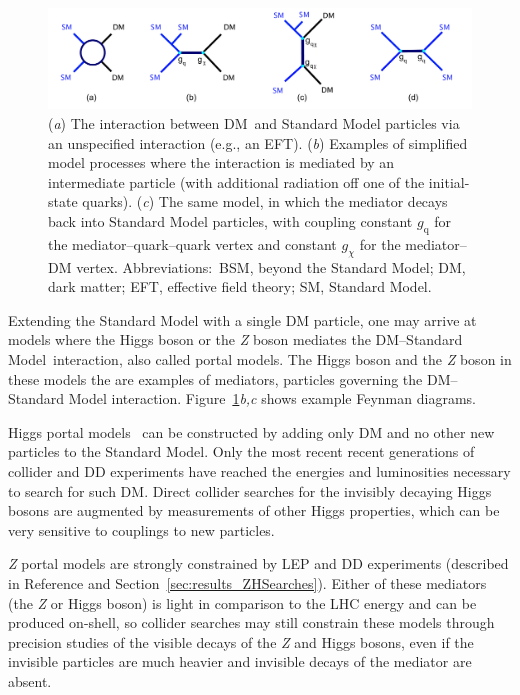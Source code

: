 \documentclass{ar-1col}
\newcommand{\chiDM}{\ensuremath{\chi}\xspace}
\newcommand{\IP}{invisible particle}
\newcommand{\gDM}{\ensuremath{g_{\chiDM}}\xspace}
\newcommand{\gdm}{\gDM}
\newcommand{\gq}{$g_{\mathrm{q}}$\xspace}
\begin{document}
{\begin{figure}[!htpb]
\includegraphics[width=\textwidth]{figures/feynman_0}
\caption{(\textit{a}) The interaction between DM\ and Standard Model particles via an unspecified interaction (e.g., an EFT).
(\textit{b}) Examples of simplified model processes where the interaction is mediated by an intermediate particle (with additional radiation off one of the initial-state quarks). 
(\textit{c}) The same model, in which  the mediator decays back into Standard Model particles, with coupling constant  \gq  for the mediator--quark--quark vertex and constant  \gdm for the mediator--DM vertex. 
Abbreviations:\ BSM, beyond the Standard Model; DM, dark matter; EFT, effective field theory; SM, Standard Model. \label{fig:feynman_0}}
\end{figure}

Extending the Standard Model with a single DM particle, one
may arrive at models where the Higgs boson or the \textit{Z} boson mediates
the DM--Standard Model\  interaction, also called portal models. 
The Higgs boson and the \textit{Z} boson in these models the are examples of {mediators}, 
particles governing the DM--Standard Model interaction. 
Figure~\ref{fig:feynman_0}\textit{b,c} shows example Feynman diagrams.

{Higgs portal} models~\cite{Patt:2006fw,Djouadi:2011aa} can be constructed by adding only DM and no other new particles to the Standard Model. 
Only the most recent recent generations of collider and DD
experiments have reached the energies and luminosities necessary to
search for such DM. Direct collider searches for the
invisibly decaying Higgs bosons are augmented by measurements of
other Higgs properties, which can be very sensitive to couplings
to new particles.

{\textit{Z} portal} models are strongly constrained
by LEP and DD experiments (described in Reference  and Section~\ref{sec:results_ZHSearches}). 
Either of these mediators (the \textit{Z} or Higgs boson) is light in
comparison to the LHC energy and can be produced on-shell, so
collider searches may still constrain these models 
through precision studies of the visible decays of the \textit{Z} and Higgs bosons, 
even if the {\IP}s are much heavier and invisible decays of the mediator
are absent. 

}
\end{document}
